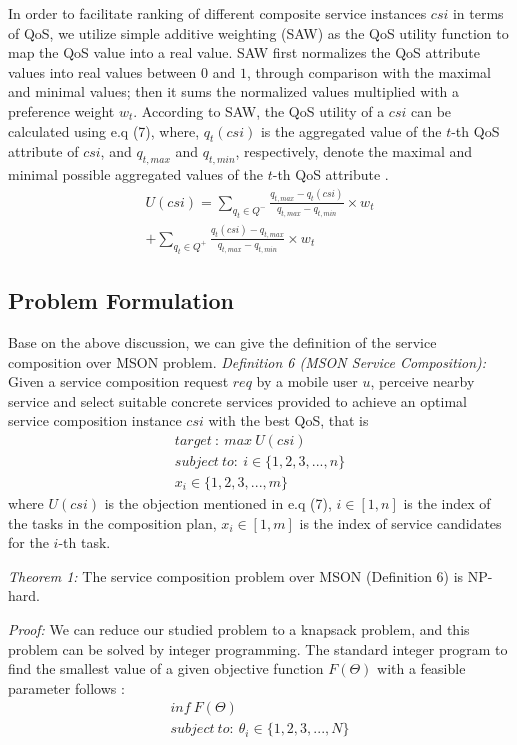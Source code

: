 \documentclass[10pt,journal,compsoc]{IEEEtran}
\begin{document}
In order to facilitate ranking of different composite service instances $csi$ in terms of QoS, we utilize simple additive weighting (SAW) as the QoS utility function to map the QoS value into a real value. SAW first normalizes the QoS attribute values into real values between $0$ and $1$, through comparison with the maximal and minimal values; then it sums the normalized values multiplied with a preference weight $w_t$. According to SAW, the QoS utility of a $csi$ can be calculated using e.q (7), where, $q_t(csi)$ is the aggregated value of the $t$-th QoS attribute of $csi$, and $q_{t,max}$ and $q_{t,min}$, respectively, denote the maximal and minimal possible aggregated values of the $t$-th QoS attribute \cite{Wu2016}.
\begin{eqnarray}
U(csi) = \sum_{q_t \in Q^-} \frac{q_{t,max}-q_t(csi)}{q_{t,max}-q_{t,min}}\times w_t \\\nonumber
+\sum_{q_t \in Q^+} \frac{q_t(csi)-q_{t,max}}{q_{t,max}-q_{t,min}}\times w_t
\end{eqnarray}

\subsection{Problem Formulation}
Base on the above discussion, we can give the definition of the service composition over MSON problem.
\textit{Definition 6 (MSON Service Composition):} Given a service composition request $req$ by a mobile user $u$, perceive nearby service and select suitable concrete services provided to achieve an optimal service composition instance $csi$ with the best QoS, that is
\begin{eqnarray}
target \ : \  max \ U(csi)\qquad\  \\\nonumber
subject \ to: \ i \in \{1,2,3,...,n \}  \\\nonumber
x_i \in \{1,2,3,...,m \}
\end{eqnarray}
where $U(csi)$ is the objection mentioned in e.q (7), $i \in [1,n]$ is the index of the tasks in the composition plan, $x_i \in [1, m]$ is the index of service candidates for the $i$-th task.

\textit{Theorem 1:} The service composition problem over MSON (Definition 6) is NP-hard.

\textit{Proof:} We can reduce our studied problem to a knapsack problem, and this problem can be solved by integer programming. The standard integer program to find the smallest value of a given objective function $F( \Theta)$ with a feasible parameter follows \cite{glover1986future}:
\begin{eqnarray}
inf \ F(\Theta) \qquad \qquad \quad \\\nonumber
subject \ to: \ \theta_i \in\{1,2,3,...,N\}
\end{eqnarray}
\end{document}

